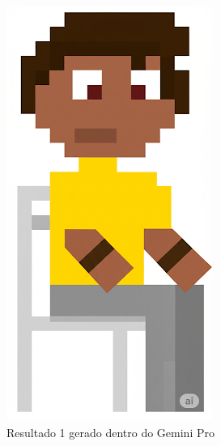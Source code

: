 \begin{figure}[htbp]
\begin{subfigure}{0.32\linewidth}
    \centering
        \includegraphics[width=0.8\linewidth]{figs/geminiPro/compararDalle3_res.PNG}
        \caption{\small Resultado 1 gerado dentro do Gemini Pro}
        \label{fig:openArtComparaGemini2}
    \end{subfigure}
    \begin{subfigure}{0.32\linewidth}
    \centering

\end{subfigure}
\end{figure}
